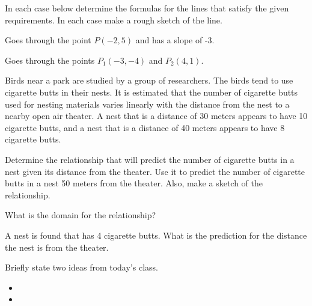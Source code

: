 \begin{problem}
\item In each case below determine the formulas for the lines that
  satisfy the given requirements. In each case make a rough sketch of
  the line.

  \begin{subproblem}
  \item Goes through the point $P(-2,5)$ and has a slope of -3.
    \vfill
  \item Goes through the points $P_1(-3,-4)$ and $P_2(4,1)$.
    \vfill
  \end{subproblem}

  \clearpage

\item Birds near a park are studied by a group of researchers. The
  birds tend to use cigarette butts in their nests. It is estimated
  that the number of cigarette butts used for nesting materials varies
  linearly with the distance from the nest to a nearby open air
  theater. A nest that is a distance of 30 meters appears to have 10
  cigarette butts, and a nest that is a distance of 40 meters appears
  to have 8 cigarette butts. 
  \begin{subproblem}
  \item Determine the relationship that will predict the number of
    cigarette butts in a nest given its distance from the theater.
    Use it to predict the number of cigarette butts in a nest 50
    meters from the theater. Also, make a sketch of the relationship.

    \vfill 
    \vfill
    \vfill

  \item What is the domain for the relationship?
    \vfill
  \item A nest is found that has 4 cigarette butts. What is the
    prediction for the distance the nest is from the theater.
    \vfill
  \end{subproblem}

  \vfill


\end{problem}

\postClass

\begin{problem}
\item Briefly state two ideas from today's class.
  \begin{itemize}
  \item 
  \item 
  \end{itemize}
\item 
  \begin{subproblem}
    \item
  \end{subproblem}
\end{problem}


